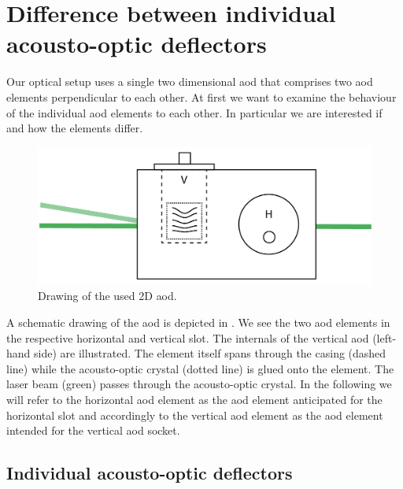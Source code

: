 \section{Difference between individual acousto-optic deflectors}

Our optical setup uses a single two dimensional \gls{aod} that comprises two
\gls{aod} elements perpendicular to each other. At first we want to examine the
behaviour of the individual \gls{aod} elements to each other. In particular we
are interested if and how the elements differ.
\begin{figure}[htb]
  \centering
  \includegraphics[width=\textwidth]{../media/setup/aod-socket.png}
  \caption{Drawing of the used 2D \gls{aod}.
  }\label{fig:aod_socket}
\end{figure}
A schematic drawing of the \gls{aod} is depicted in . We
see the two \gls{aod} elements in the respective horizontal and vertical slot.
The internals of the vertical \gls{aod} (left-hand side) are illustrated. The
element itself spans through the casing (dashed line) while the acousto-optic
crystal (dotted line) is glued onto the element. The laser beam (green) passes
through the acousto-optic crystal. In the following we will refer to the
horizontal \gls{aod} element as the \gls{aod} element anticipated for the
horizontal slot and accordingly to the vertical \gls{aod} element as the
\gls{aod} element intended for the vertical \gls{aod} socket.

\subsection{Individual acousto-optic deflectors}

